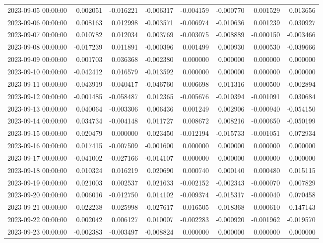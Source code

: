 \begin{tabular}{lrrrrrrr}
2023-09-05 00:00:00 & 0.002051 & -0.016221 & -0.006317 & -0.004159 & -0.000770 & 0.001529 & 0.013656 \\
2023-09-06 00:00:00 & 0.008163 & 0.012998 & -0.003571 & -0.006974 & -0.010636 & 0.001239 & 0.030927 \\
2023-09-07 00:00:00 & 0.010782 & 0.012034 & 0.003769 & -0.003075 & -0.008889 & -0.000150 & -0.003466 \\
2023-09-08 00:00:00 & -0.017239 & 0.011891 & -0.000396 & 0.001499 & 0.000930 & 0.000530 & -0.039666 \\
2023-09-09 00:00:00 & 0.001703 & 0.036368 & -0.002380 & 0.000000 & 0.000000 & 0.000000 & 0.000000 \\
2023-09-10 00:00:00 & -0.042412 & 0.016579 & -0.013592 & 0.000000 & 0.000000 & 0.000000 & 0.000000 \\
2023-09-11 00:00:00 & -0.043919 & -0.040417 & -0.046760 & 0.006698 & 0.011316 & 0.000500 & -0.002894 \\
2023-09-12 00:00:00 & -0.001485 & -0.058487 & 0.012365 & -0.005676 & -0.010394 & -0.001091 & 0.030684 \\
2023-09-13 00:00:00 & 0.040064 & -0.003306 & 0.006436 & 0.001249 & 0.002906 & -0.000940 & -0.054150 \\
2023-09-14 00:00:00 & 0.034734 & -0.004148 & 0.011727 & 0.008672 & 0.008216 & -0.000650 & -0.050199 \\
2023-09-15 00:00:00 & 0.020479 & 0.000000 & 0.023450 & -0.012194 & -0.015733 & -0.001051 & 0.072934 \\
2023-09-16 00:00:00 & 0.017415 & -0.007509 & -0.001600 & 0.000000 & 0.000000 & 0.000000 & 0.000000 \\
2023-09-17 00:00:00 & -0.041002 & -0.027166 & -0.014107 & 0.000000 & 0.000000 & 0.000000 & 0.000000 \\
2023-09-18 00:00:00 & 0.010324 & 0.016219 & 0.020690 & 0.000740 & 0.000140 & 0.000480 & 0.015115 \\
2023-09-19 00:00:00 & 0.021003 & 0.002537 & 0.021633 & -0.002152 & -0.002343 & -0.000070 & 0.007829 \\
2023-09-20 00:00:00 & 0.006016 & -0.012750 & 0.014102 & -0.009374 & -0.015317 & -0.000040 & 0.070458 \\
2023-09-21 00:00:00 & -0.022238 & -0.025998 & -0.027617 & -0.016505 & -0.018368 & 0.000610 & 0.147143 \\
2023-09-22 00:00:00 & 0.002042 & 0.006127 & 0.010007 & -0.002283 & -0.000920 & -0.001962 & -0.019570 \\
2023-09-23 00:00:00 & -0.002383 & -0.003497 & -0.008824 & 0.000000 & 0.000000 & 0.000000 & 0.000000 \\

\end{tabular}
